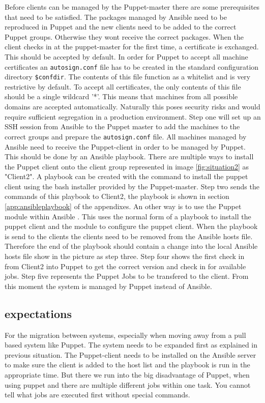 Before clients can be managed by the Puppet-master there are some prerequisites that need to be satisfied. The packages managed by Ansible need to be reproduced in Puppet and the new clients need to be added to the correct Puppet groups. Otherwise they wont receive the correct packages. When the client checks in at the puppet-master for the first time, a certificate is exchanged. This should be accepted by default. In order for Puppet to accept all machine certificates an \texttt{autosign.conf} file has to be created in the standard configuration directory \texttt{\$confdir}. The contents of this file function as a whitelist and is very restrictive by default. To accept all certificates, the only contents of this file should be a single wildcard '*'. This means that machines from all possible domains are accepted automatically. Naturally this poses security risks and would require sufficient segregation in a production environment. Step one will set up an SSH session from Ansible to the Puppet master to add the machines to the correct groups and prepare the \texttt{autosign.conf} file. All machines managed by Ansible need to receive the Puppet-client in order to be managed by Puppet. This should be done by an Ansible playbook. There are multiple ways to install the Puppet client onto the client group represented in image \ref{fig:situation2} as "Client2". A playbook can be created with the command to install the puppet client using the bash installer provided by the Puppet-master. Step two sends the commands of this playbook to Client2, the playbook is shown in section \ref{app:ansibleplaybook} of the appendixes. An other way is to use the Puppet module within Ansible \cite{ansiblepuppet}. This uses the normal form of a playbook to install the puppet client and the module to configure the puppet client. When the playbook is send to the clients the clients need to be removed from the Ansible hosts file. Therefore the end of the playbook should contain a change into the local Ansible hosts file show in the picture as step three.  Step four shows the first check in from Client2 into Puppet to get the correct version and check in for available jobs. Step five represents the Puppet Jobs to be transfered to the client. From this moment the system is managed by Puppet instead of Ansible.    

\subsection{expectations}\label{subsec:expectations}
For the migration between systems, especially when moving away from a pull based system like Puppet. The system needs to be expanded first as explained in previous situation. The Puppet-client needs to be installed on the Ansible server to make sure the client is added to the host list and the playbook is run in the appropriate time. But there we run into the big disadvantage of Puppet, when using puppet and there are multiple different jobs within one task. You cannot tell what jobs are executed first without special commands.  

